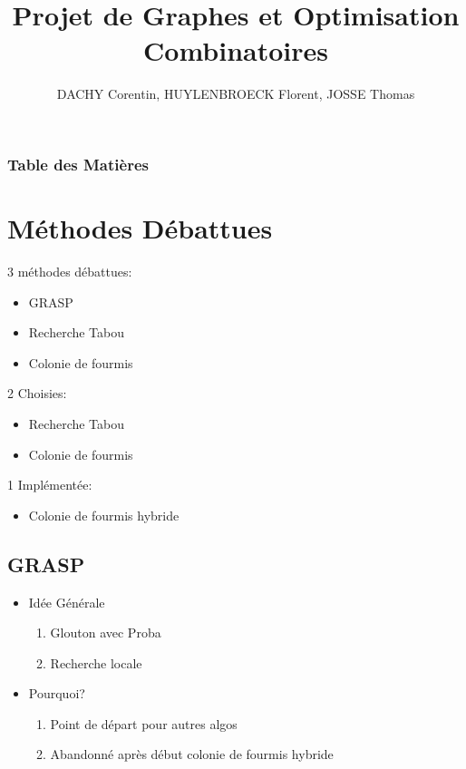 \documentclass[b]{beamer}
\title[Projet de Graphes et Optimisation Combinatoire]{Projet de Graphes et Optimisation Combinatoires}
\author{DACHY Corentin, HUYLENBROECK Florent, JOSSE Thomas}
\begin{document}
\begin{frame}
	\titlepage
\end{frame}

\begin{frame}
	\frametitle{Table des Matières}
	\tableofcontents
\end{frame}

\section{Méthodes Débattues}

\begin{frame}
	
	3 méthodes débattues:
	\begin{itemize}
		\item GRASP
		\item Recherche Tabou
		\item Colonie de fourmis
	\end{itemize}
	2 Choisies:
		\begin{itemize}
			\item Recherche Tabou
			\item Colonie de fourmis
		\end{itemize}
	1 Implémentée:
		\begin{itemize}
			\item Colonie de fourmis hybride
		\end{itemize}
\end{frame}

\subsection{GRASP}

\begin{frame}

\begin{itemize}
	\item Idée Générale
	\begin{enumerate}
		\item Glouton avec Proba
		\item Recherche locale 
	\end{enumerate}
	\item Pourquoi? 
	\begin{enumerate}
		\item Point de départ pour autres algos
		\item Abandonné après début colonie de fourmis hybride
	\end{enumerate}
\end{itemize}

\end{frame}
\end{document}
